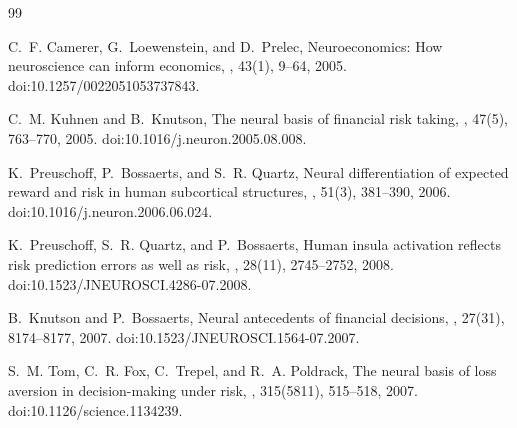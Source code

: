 \documentclass[graybox,natbib]{SNmult}
\providecommand{\1}{}
\renewcommand{\1}{\mathbbm 1}
\begin{document}
\begin{thebibliography}{99}


C.~F. Camerer, G.~Loewenstein, and D.~Prelec,
\newblock Neuroeconomics: How neuroscience can inform economics,
,
43(1), 9--64, 2005.
\newblock doi:10.1257/0022051053737843.


C.~M. Kuhnen and B.~Knutson,
\newblock The neural basis of financial risk taking,
,
47(5), 763--770, 2005.
\newblock doi:10.1016/j.neuron.2005.08.008.

K.~Preuschoff, P.~Bossaerts, and S.~R. Quartz,
\newblock Neural differentiation of expected reward and risk in human
subcortical structures,
,
51(3), 381--390, 2006.
\newblock doi:10.1016/j.neuron.2006.06.024.

K.~Preuschoff, S.~R. Quartz, and P.~Bossaerts,
\newblock Human insula activation reflects risk prediction errors as well as
risk,
,
28(11), 2745--2752, 2008.
\newblock doi:10.1523/JNEUROSCI.4286-07.2008.

B.~Knutson and P.~Bossaerts,
\newblock Neural antecedents of financial decisions,
,
27(31), 8174--8177, 2007.
\newblock doi:10.1523/JNEUROSCI.1564-07.2007.


S.~M. Tom, C.~R. Fox, C.~Trepel, and R.~A. Poldrack,
\newblock The neural basis of loss aversion in decision-making under risk,
,
315(5811), 515--518, 2007.
\newblock doi:10.1126/science.1134239.


\end{thebibliography}
\end{document}
